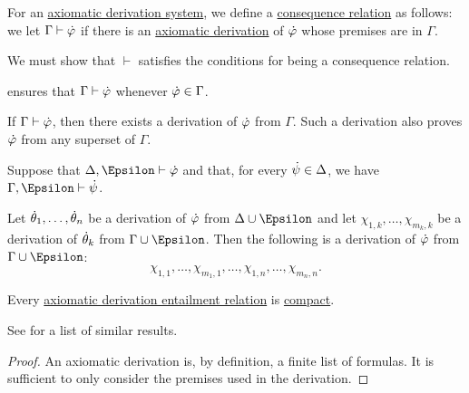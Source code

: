 \begin{definition}\label{def:axiomatic_derivation_entailment}
  For an \hyperref[def:axiomatic_derivation_system]{axiomatic derivation system}, we define a \hyperref[def:consequence_relation]{consequence relation} as follows: we let \( \Gamma \vdash \dot{\varphi} \) if there is an \hyperref[def:axiomatic_derivation]{axiomatic derivation} of \( \dot{\varphi} \) whose premises are in \( \Gamma \).
\end{definition}
\begin{defproof}
  We must show that \( {\vdash} \) satisfies the conditions for being a consequence relation.

    ensures that \( \Gamma \vdash \dot{\varphi} \) whenever \( \dot{\varphi} \in \Gamma \).

   If \( \Gamma \vdash \dot{\varphi} \), then there exists a derivation of \( \dot{\varphi} \) from \( \Gamma \). Such a derivation also proves \( \dot{\varphi} \) from any superset of \( \Gamma \).

   Suppose that \( \Delta, \Epsilon \vdash \syn\varphi \) and that, for every \( \dot{\psi} \in \Delta \), we have \( \Gamma, \Epsilon \vdash \syn\psi \).

  Let \( \dot{\theta}_1, \ldots, \dot{\theta}_n \) be a derivation of \( \dot{\varphi} \) from \( \Delta \cup \Epsilon \) and let \( \chi_{1,k}, \ldots, \chi_{m_k,k} \) be a derivation of \( \dot{\theta}_k \) from \( \Gamma \cup \Epsilon \). Then the following is a derivation of \( \dot{\varphi} \) from \( \Gamma \cup \Epsilon \):
  \begin{equation*}
    \chi_{1,1}, \ldots, \chi_{m_1,1}, \ldots, \chi_{1,n}, \ldots, \chi_{m_n,n}.
  \end{equation*}
\end{defproof}

\begin{proposition}\label{thm:axiomatic_derivation_entailment_compact}
  Every \hyperref[def:axiomatic_derivation_entailment]{axiomatic derivation entailment relation} is \hyperref[def:consequence_relation/compactness]{compact}.
\end{proposition}
\begin{comments}
  \item See  for a list of similar results.
\end{comments}
\begin{proof}
  An axiomatic derivation is, by definition, a finite list of formulas. It is sufficient to only consider the premises used in the derivation.
\end{proof}

